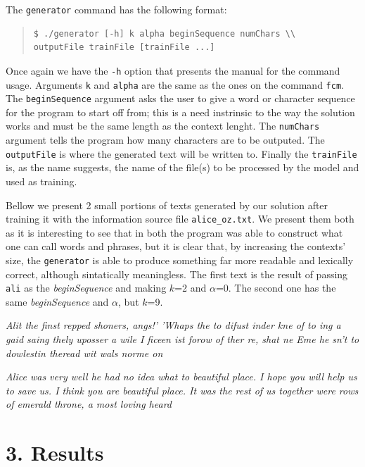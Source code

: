 \documentclass[12pt]{article}
\begin{document}
The \texttt{generator} command has the following format: 

\begin{quote}
\begin{verbatim}
$ ./generator [-h] k alpha beginSequence numChars \\
outputFile trainFile [trainFile ...]
\end{verbatim}
\end{quote}

Once again we have the \texttt{-h} option that presents the manual for the 
command usage.
Arguments \texttt{k} and \texttt{alpha} are the same as the ones on the 
command \texttt{fcm}.
The \texttt{beginSequence} argument asks the user to give a word or character
sequence for the program to start off from; this is a need instrinsic to the
way the solution works and must be the same length as the context lenght.
The \texttt{numChars} argument tells the program how many characters are to 
be outputed.
The \texttt{outputFile} is where the generated text will be written to.
Finally the \texttt{trainFile} is, as the name suggests, the name of the 
file(s) to be processed by the model and used as training.

Bellow we present 2 small portions of texts generated by our solution 
after training it with the information source file \texttt{alice\_oz.txt}.
We present them both as it is interesting to see that in both the program was
able to construct what one can call words and phrases, but it is clear that,
by increasing the contexts' size, the \texttt{generator} is able to produce 
something far more readable and lexically correct, although sintatically 
meaningless.
The first text is the result of passing \texttt{ali} as the 
{\it beginSequence\/} and making \(k\)=2 and $\alpha$=0.
The second one has the same {\it beginSequence\/} and $\alpha$, but \(k\)=9.

{\it Alit the finst repped shoners, angs!' 'Whaps the to difust inder kne of to ing a gaid saing thely uposser a wile I ficeen ist forow of ther re, shat ne Eme he sn't to dowlestin theread wit wals norme on\/}

{\it Alice was very well he had no idea what to beautiful place. I hope you will help us to save us. I think you are beautiful place. It was the rest of us together were rows of emerald throne, a most loving heard\/}

\newpage
\section*{3. Results}
\end{document}
